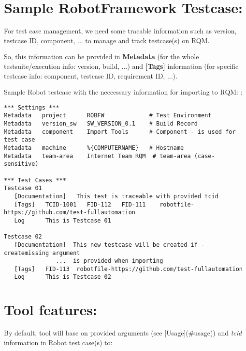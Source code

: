 %
%

\hypertarget{description-sample-robotframework-testcase}{%
\section{Sample RobotFramework
Testcase:}\label{description-sample-robotframework-testcase}}

For test case management, we need some tracable information such as
version, testcase ID, component, ... to manage and track testcase(s) on
RQM.

So, this information can be provided in \textbf{Metadata} (for the whole
testsuite/execution info: version, build, ...) and \textbf{{[}Tags{]}}
information (for specific testcase info: component, testcase ID,
requirement ID, ...).

Sample Robot testcase with the neccessary information for importing to
RQM: :

\begin{verbatim}
*** Settings ***
Metadata   project      ROBFW             # Test Environment
Metadata   version_sw   SW_VERSION_0.1    # Build Record
Metadata   component    Import_Tools      # Component - is used for test case
Metadata   machine      %{COMPUTERNAME}   # Hostname
Metadata   team-area    Internet Team RQM  # team-area (case-sensitive)

*** Test Cases ***
Testcase 01
   [Documentation]   This test is traceable with provided tcid
   [Tags]   TCID-1001   FID-112   FID-111    robotfile-https://github.com/test-fullautomation
   Log      This is Testcase 01

Testcase 02
   [Documentation]  This new testcase will be created if -createmissing argument
               ...  is provided when importing
   [Tags]   FID-113  robotfile-https://github.com/test-fullautomation
   Log      This is Testcase 02
\end{verbatim}

\hypertarget{description-tool-features}{%
\section{Tool features:}\label{description-tool-features}}

By default, tool will base on provided arguments (see
{[}Usage{]}(\#usage)) and \emph{tcid} information in Robot test case(s)
to:

